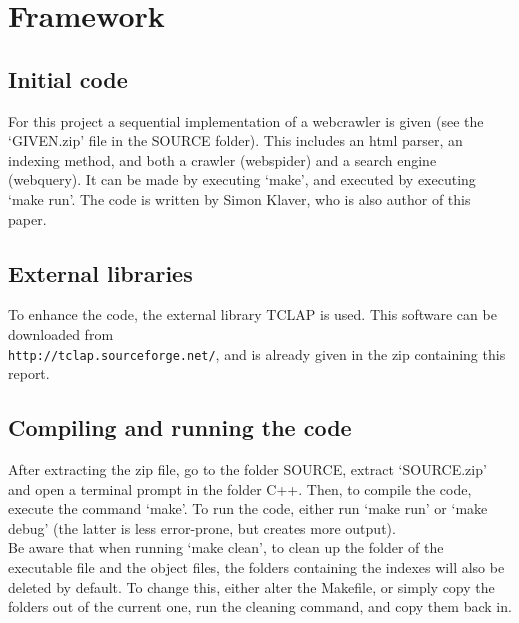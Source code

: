 \documentclass{sig-alternate-05-2015}
\begin{document}
\section{Framework}
\subsection{Initial code}
For this project a sequential implementation of a webcrawler is given (see the `GIVEN.zip' file in the SOURCE folder). This includes an html parser, an indexing method, and both a crawler (webspider) and a search engine (webquery). It can be made by executing `make', and executed by executing `make run'. The code is written by Simon Klaver, who is also author of this paper.
\subsection{External libraries}
To enhance the code, the external library TCLAP is used. This software can be downloaded from \\\verb+http://tclap.sourceforge.net/+, and is already given in the zip containing this report.
\subsection{Compiling and running the code}
After extracting the zip file, go to the folder SOURCE, extract `SOURCE.zip' and open a terminal prompt in the folder C++. Then, to compile the code, execute the command `make'. To run the code, either run `make run' or `make debug' (the latter is less error-prone, but creates more output).\\
Be aware that when running `make clean', to clean up the folder of the executable file and the object files, the folders containing the indexes will also be deleted by default. To change this, either alter the Makefile, or simply copy the folders out of the current one, run the cleaning command, and copy them back in.
\end{document}
